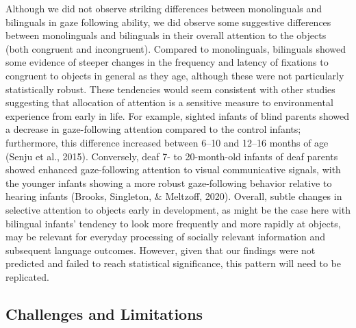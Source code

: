 \documentclass[,man,floatsintext]{apa6}
\begin{document}
Although we did not observe striking differences between monolinguals and bilinguals in gaze following ability, we did observe some suggestive differences between monolinguals and bilinguals in their overall attention to the objects (both congruent and incongruent). Compared to monolinguals, bilinguals showed some evidence of steeper changes in the frequency and latency of fixations to congruent to objects in general as they age, although these were not particularly statistically robust. These tendencies would seem consistent with other studies suggesting that allocation of attention is a sensitive measure to environmental experience from early in life. For example, sighted infants of blind parents showed a decrease in gaze-following attention compared to the control infants; furthermore, this difference increased between 6--10 and 12--16 months of age (Senju et al., 2015). Conversely, deaf 7- to 20-month-old infants of deaf parents showed enhanced gaze-following attention to visual communicative signals, with the younger infants showing a more robust gaze-following behavior relative to hearing infants (Brooks, Singleton, \& Meltzoff, 2020). Overall, subtle changes in selective attention to objects early in development, as might be the case here with bilingual infants' tendency to look more frequently and more rapidly at objects, may be relevant for everyday processing of socially relevant information and subsequent language outcomes. However, given that our findings were not predicted and failed to reach statistical significance, this pattern will need to be replicated.

\hypertarget{challenges-and-limitations}{%
\subsection{Challenges and Limitations}\label{challenges-and-limitations}}
\end{document}
